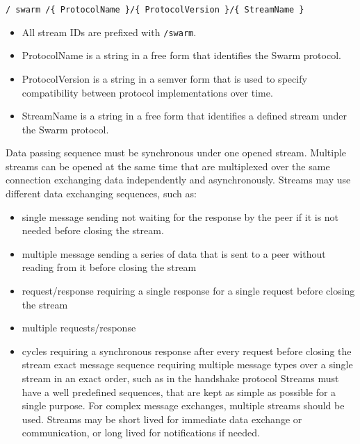 \texttt{/\ swarm\ /\{\ ProtocolName\ \}/\{\ ProtocolVersion\ \}/\{\ StreamName\ \}}
\begin{itemize}
    \item All stream IDs are prefixed with \texttt{/swarm}.    
    \item ProtocolName is a string in a free form that identifies the Swarm protocol.
    \item ProtocolVersion is a string in a semver form that is used to specify compatibility between protocol implementations over time.
    \item StreamName is a string in a free form that identifies a defined stream under the Swarm protocol.
\end{itemize}
Data passing sequence must be synchronous under one opened stream.
Multiple streams can be opened at the same time that are multiplexed
over the same connection exchanging data independently and
asynchronously. Streams may use different data exchanging sequences,
such as:
\begin{itemize}
    \item single message sending not waiting for the response by the peer if it is not needed before closing the stream.
    \item multiple message sending a series of data that is sent to a peer without reading from it before
closing the stream
    \item request/response requiring a single response for a single request before closing the stream
    \item  multiple requests/response
    \item cycles requiring a synchronous response after every request before closing the stream
exact message sequence requiring multiple message types over a single stream in an exact order, such as in the handshake protocol Streams must have a well predefined sequences, that are kept as simple as possible for a single purpose. For complex message exchanges, multiple streams should be used. Streams may be short lived for immediate data exchange or communication, or long lived for notifications if needed.
\end{itemize}